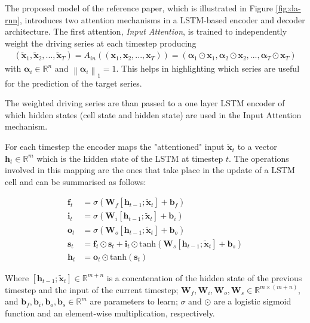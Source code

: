 \documentclass{article}
\newcommand{\norm}[1]{\left\lVert#1\right\rVert}
\begin{document}
The proposed model of the reference paper, which is illustrated in Figure \ref{fig:da-rnn},
introduces two attention mechanisms in a LSTM-based encoder and decoder architecture.
The first attention, \textit{Input Attention}, is trained to independently weight
the driving series at each timestep producing
\begin{align*}
(\tilde{\mathbf{x}}_1, \tilde{\mathbf{x}}_2, ..., \tilde{\mathbf{x}}_T) = A_{in}((\mathbf{x}_1, \mathbf{x}_2, ..., \mathbf{x}_T)) =
(\boldsymbol{\alpha}_1 \odot \mathbf{x}_1, \boldsymbol{\alpha}_2 \odot \mathbf{x}_2, ..., \boldsymbol{\alpha}_T \odot \mathbf{x}_T)
\end{align*}
with $\boldsymbol{\alpha}_i \in \mathbb{R}^n$ and $\norm{\boldsymbol{\alpha}_i}_1 = 1$.
This helps in highlighting which series are useful for the prediction of
the target series.

The weighted driving series are than passed to a one layer LSTM encoder of
which hidden states (cell state and hidden state) are used in the Input Attention
mechanism.

For each timestep the encoder maps the "attentioned" input $\tilde{\mathbf{x}}_t$ to a vector
$\mathbf{h}_t \in \mathbb{R}^m$ which is the hidden state of
the LSTM at timestep $t$. The operations involved in this mapping are the ones
that take place in the update of a LSTM cell and can be summarised as follows:


\begin{equation} \label{eq:lstm}
\begin{split}
\mathbf{f}_t &= \sigma (\mathbf{W}_f[\mathbf{h}_{t-1};\tilde{\mathbf{x}}_t] +
\mathbf{b}_f) \\
\mathbf{i}_t &= \sigma (\mathbf{W}_i[\mathbf{h}_{t-1};\tilde{\mathbf{x}}_t] +
\mathbf{b}_i) \\
\mathbf{o}_t &= \sigma (\mathbf{W}_o[\mathbf{h}_{t-1};\tilde{\mathbf{x}}_t] +
\mathbf{b}_o) \\
\mathbf{s}_t &= \mathbf{f}_t \odot \mathbf{s}_t + \mathbf{i}_t 
				\odot
\text{tanh}(\mathbf{W}_s[\mathbf{h}_{t-1};\tilde{\mathbf{x}}_t] + \mathbf{b}_s) \\
\mathbf{h}_t &= \mathbf{o}_t \odot \text{tanh}(\mathbf{s}_t)
\end{split}
\end{equation}

Where $[\mathbf{h}_{t-1};\tilde{\mathbf{x}}_t] \in \mathbb{R}^{m + n}$ is a
concatenation of the hidden state of the previous
timestep and the input of the current timestep;
$\mathbf{W}_f,\mathbf{W}_i,\mathbf{W}_o,\mathbf{W}_s
\in \mathbb{R}^{m \times(m+n)}$, and $\mathbf{b}_f, \mathbf{b}_i,
\mathbf{b}_o,\mathbf{b}_s \in \mathbb{R}^m$ are
parameters to learn; $\sigma$ and $\odot$ are a logistic sigmoid function and
an element-wise multiplication,
respectively.
\end{document}
